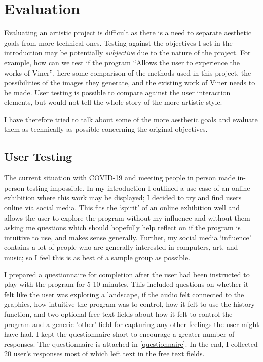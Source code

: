\chapter{Evaluation}
Evaluating an artistic project is difficult as there is a need to separate
aesthetic goals from more technical ones. Testing against the objectives I set
in the introduction may be potentially \emph{subjective} due to the nature of
the project. For example, how can we test if the program ``Allows the user to
experience the works of Viner'', here some comparison of the methods used in
this project, the possibilities of the images they generate, and the existing
work of Viner needs to be made. User testing is possible to compare against the
user interaction elements, but would not tell the whole story of the more
artistic style.

I have therefore tried to talk about some of the more aesthetic goals and
evaluate them as technically as possible concerning the original objectives.

\section{User Testing}
The current situation with COVID-19 and meeting people in person made in-person
testing impossible. In my introduction I outlined a use case of an online exhibition
where this work may be displayed; I decided to try and find users online via
social media. This fits the `spirit' of an online exhibition well and allows the
user to explore the program without my influence and without them asking me
questions which should hopefully help reflect on if the program is intuitive to
use, and makes sense generally. Further, my social media `influence' contains a
lot of people who are generally interested in computers, art, and music; so I
feel this is as best of a sample group as possible.

I prepared a questionnaire for completion after the user had been instructed to
play with the program for 5-10 minutes. This included questions on whether it
felt like the user was exploring a landscape, if the audio felt connected to the
graphics, how intuitive the program was to control, how it felt to use the
history function, and two optional free text fields about how it felt to control
the program and a generic 'other' field for capturing any other feelings the
user might have had. I kept the questionnaire short to encourage a greater
number of responses. The questionnaire is attached in \autoref{questionnaire}. In
the end, I collected 20 user's responses most of which left text in the free text
fields.

